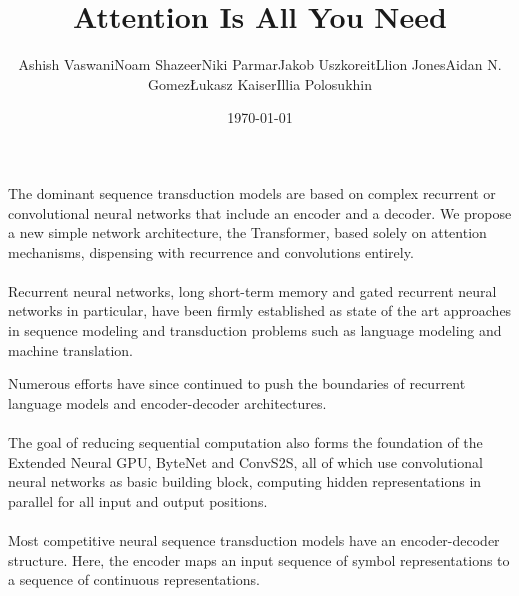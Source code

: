 \documentclass[11pt,a4paper]{article}
\title{Attention Is All You Need}
\author{Ashish VaswaniNoam ShazeerNiki ParmarJakob UszkoreitLlion JonesAidan N. GomezŁukasz KaiserIllia Polosukhin}
\date{\today}
\begin{document}
\maketitle
\paragraph{}

The dominant sequence transduction models are based on complex recurrent or convolutional neural networks that include an encoder and a decoder. We propose a new simple network architecture, the Transformer, based solely on attention mechanisms, dispensing with recurrence and convolutions entirely.


\paragraph{}

Recurrent neural networks, long short-term memory and gated recurrent neural networks in particular, have been firmly established as state of the art approaches in sequence modeling and transduction problems such as language modeling and machine translation.


Numerous efforts have since continued to push the boundaries of recurrent language models and encoder-decoder architectures.


\paragraph{}

The goal of reducing sequential computation also forms the foundation of the Extended Neural GPU, ByteNet and ConvS2S, all of which use convolutional neural networks as basic building block, computing hidden representations in parallel for all input and output positions.


\paragraph{}

Most competitive neural sequence transduction models have an encoder-decoder structure. Here, the encoder maps an input sequence of symbol representations to a sequence of continuous representations.


\paragraph{}
\end{document}

